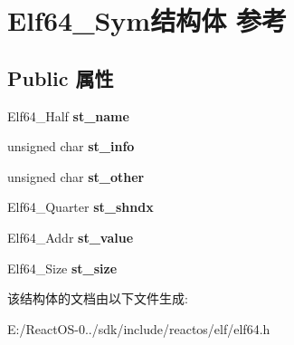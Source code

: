 \hypertarget{struct_elf64___sym}{}\section{Elf64\+\_\+\+Sym结构体 参考}
\label{struct_elf64___sym}
\subsection*{Public 属性}
\begin{DoxyCompactItemize}
\item 
\mbox{\label{struct_elf64___sym_a4ab57ed14cec2fd62166a5286b730bba}} 
Elf64\+\_\+\+Half {\bfseries st\+\_\+name}
\item 
\mbox{\label{struct_elf64___sym_a9bbd53b13b0f1403d8369cbdd15df08c}} 
unsigned char {\bfseries st\+\_\+info}
\item 
\mbox{\label{struct_elf64___sym_adba66dcdbe19ab3ecc24830a58549230}} 
unsigned char {\bfseries st\+\_\+other}
\item 
\mbox{\label{struct_elf64___sym_a030c67483fb4f1d1bfb3cb0eaf895461}} 
Elf64\+\_\+\+Quarter {\bfseries st\+\_\+shndx}
\item 
\mbox{\label{struct_elf64___sym_a9601295da4c2e81cc18c1f777609e1bf}} 
Elf64\+\_\+\+Addr {\bfseries st\+\_\+value}
\item 
\mbox{\label{struct_elf64___sym_a4ecbdf2d05e7491c9fe69274c7250eb9}} 
Elf64\+\_\+\+Size {\bfseries st\+\_\+size}
\end{DoxyCompactItemize}


该结构体的文档由以下文件生成\+:\begin{DoxyCompactItemize}
\item 
E\+:/\+React\+O\+S-\/0../sdk/include/reactos/elf/elf64.\+h\end{DoxyCompactItemize}
